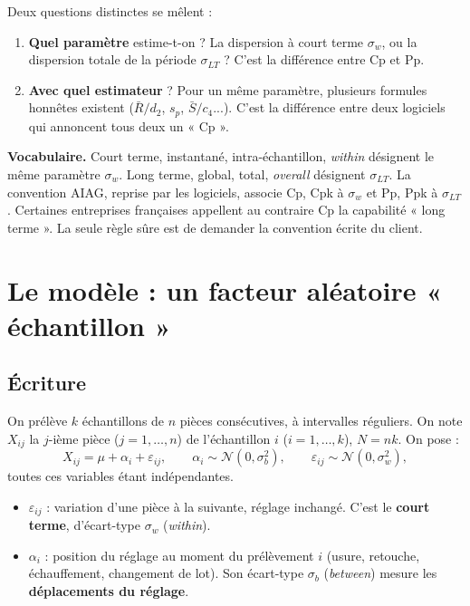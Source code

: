 \documentclass[11pt,a4paper]{article}
\theoremstyle{tq}
\theoremstyle{remark}
\newcommand{\Rb}{\bar{R}}
\newcommand{\sw}{\sigma_w}
\newcommand{\sbt}{\sigma_b}
\begin{document}
Deux questions distinctes se mêlent :
\begin{enumerate}[nosep]
\item \textbf{Quel paramètre} estime-t-on ? La dispersion à court terme $\sw$, ou la dispersion totale de la période $\sigma_{LT}$ ? C'est la différence entre Cp et Pp.
\item \textbf{Avec quel estimateur} ? Pour un même paramètre, plusieurs formules honnêtes existent ($\Rb/d_2$, $s_p$, $\bar S/c_4$...). C'est la différence entre deux logiciels qui annoncent tous deux un « Cp ».
\end{enumerate}

\textbf{Vocabulaire.} Court terme, instantané, intra-échantillon, \emph{within} désignent le même paramètre $\sw$. Long terme, global, total, \emph{overall} désignent $\sigma_{LT}$. La convention AIAG, reprise par les logiciels, associe Cp, Cpk à $\sw$ et Pp, Ppk à $\sigma_{LT}$. Certaines entreprises françaises appellent au contraire Cp la capabilité « long terme ». La seule règle sûre est de demander la convention écrite du client.

\section{Le modèle : un facteur aléatoire « échantillon »}

\subsection{Écriture}

On prélève $k$ échantillons de $n$ pièces consécutives, à intervalles réguliers. On note $X_{ij}$ la $j$-ième pièce ($j = 1,\dots,n$) de l'échantillon $i$ ($i = 1,\dots,k$), $N = nk$. On pose :
\[
X_{ij} = \mu + \alpha_i + \varepsilon_{ij},\qquad
\alpha_i \sim \mathcal N(0,\sbt^2),\qquad
\varepsilon_{ij} \sim \mathcal N(0,\sw^2),
\]
toutes ces variables étant indépendantes.
\begin{itemize}[nosep]
\item $\varepsilon_{ij}$ : variation d'une pièce à la suivante, réglage inchangé. C'est le \textbf{court terme}, d'écart-type $\sw$ (\emph{within}).
\item $\alpha_i$ : position du réglage au moment du prélèvement $i$ (usure, retouche, échauffement, changement de lot). Son écart-type $\sbt$ (\emph{between}) mesure les \textbf{déplacements du réglage}.
\end{itemize}
\end{document}
